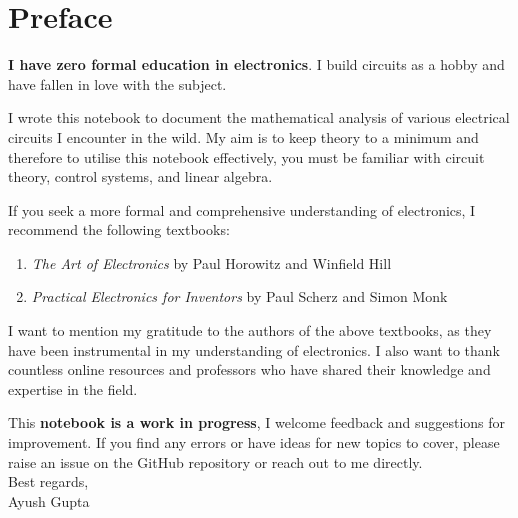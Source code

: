 \chapter*{Preface}
\textbf{I have zero formal education in electronics}. I build
circuits as a hobby and have fallen in love with the subject.

I wrote this notebook to document the mathematical analysis
of various electrical circuits I encounter in the wild. My aim
is to keep theory to a minimum and therefore to utilise this
notebook effectively, you must be familiar with circuit theory,
control systems, and linear algebra.

If you seek a more formal and comprehensive understanding of
electronics, I recommend the following textbooks:
\begin{enumerate}
    \item \textit{The Art of Electronics} by Paul Horowitz and Winfield Hill
    \item \textit{Practical Electronics for Inventors} by Paul Scherz and Simon Monk
\end{enumerate}

I want to mention my gratitude to the authors of the above
textbooks, as they have been instrumental in my understanding
of electronics. I also want to thank countless online resources
and professors who have shared their knowledge and expertise in
the field.

This \textbf{notebook is a work in progress}, I welcome feedback
and suggestions for improvement. If you find any errors or have
ideas for new topics to cover, please raise an issue on the GitHub
repository or reach out to me directly.
\\
Best regards,\\
Ayush Gupta


